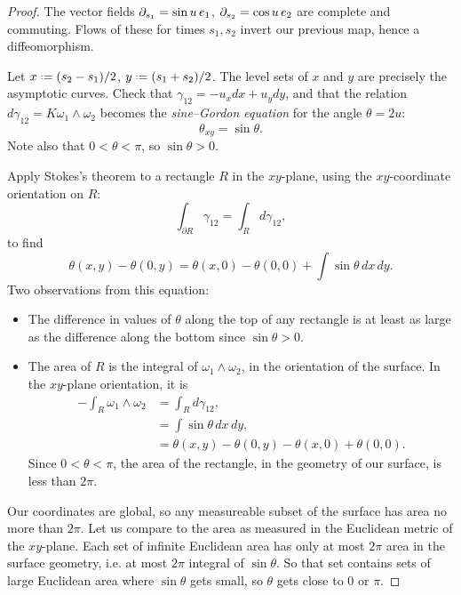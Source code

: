 \begin{proof}
The vector fields \(\partial_{s_1}=\sin u \, e_1\), \(\partial_{s_2}=\cos u \, e_2\) are complete and commuting.
Flows of these for times \(s_1,s_2\) invert our previous map, hence a diffeomorphism.

Let \(x\defeq(s_2-s_1)/2\), \(y\defeq(s_1+s_2)/2\).
The level sets of \(x\) and \(y\) are precisely the asymptotic curves.
Check that \(\gamma_{12}=-u_xdx+u_ydy\), and that the relation \(d\gamma_{12}=K\omega_1\wedge\omega_2\) becomes the \emph{sine--Gordon equation} for the angle \(\theta=2u\):
\[
\theta_{xy}=\sin\theta.
\]
Note also that \(0<\theta<\pi\), so \(\sin\theta>0\).

Apply Stokes's theorem to a rectangle \(R\) in the \(xy\)-plane, using the \(xy\)-coordinate orientation on \(R\):
\[
\int_{\partial R}\gamma_{12}=\int_R d\gamma_{12},
\]
to find
\[
\theta(x,y)-\theta(0,y)=\theta(x,0)-\theta(0,0)+\int \sin \theta \, dx \, dy.
\]
Two observations from this equation:
\begin{itemize}
\item
The difference in values of \(\theta\) along the top of any rectangle is at least as large as the difference along the bottom since \(\sin\theta>0\).
\item
The area of \(R\) is the integral of \(\omega_1\wedge\omega_2\), in the orientation of the surface.
In the \(xy\)-plane orientation, it is
\begin{align*}
-\int_R \omega_1\wedge\omega_2
&=
\int_R d\gamma_{12},
\\
&=\int \sin \theta \, dx \, dy,
\\
&=\theta(x,y)-\theta(0,y)-\theta(x,0)+\theta(0,0).
\end{align*}
Since \(0<\theta<\pi\), the area of the rectangle, in the geometry of our surface, is less than \(2\pi\).
\end{itemize}

Our coordinates are global, so any measureable subset of the surface has area no more than \(2\pi\).
Let us compare to the area as measured in the Euclidean metric of the \(xy\)-plane.
Each set of infinite Euclidean area has only at most \(2\pi\) area in the surface geometry, i.e. at most \(2\pi\) integral of \(\sin\theta\).
So that set contains sets of large Euclidean area where \(\sin \theta\) gets small, so \(\theta\) gets close to \(0\) or \(\pi\).


\end{proof}
